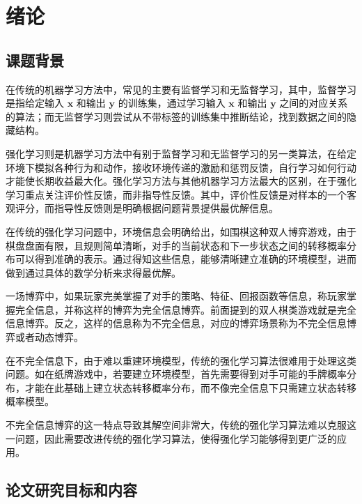 
\chapter{绪论}
\label{chpt:introduction}

\section{课题背景}

在传统的机器学习方法中，常见的主要有监督学习和无监督学习\cite{goodfellow2016deep}，其中，监督学习是指给定输入 $\boldsymbol{x}$ 和输出 $\boldsymbol{y}$ 的训练集，通过学习输入 $\boldsymbol{x}$ 和输出 $\boldsymbol{y}$ 之间的对应关系的算法；而无监督学习则尝试从不带标签的训练集中推断结论，找到数据之间的隐藏结构\cite{goodfellow2016deep}。

强化学习则是机器学习方法中有别于监督学习和无监督学习的另一类算法，在给定环境下模拟各种行为和动作，接收环境传递的激励和惩罚反馈，自行学习如何行动才能使长期收益最大化。强化学习方法与其他机器学习方法最大的区别，在于强化学习重点关注评价性反馈，而非指导性反馈。其中，评价性反馈是对样本的一个客观评分，而指导性反馈则是明确根据问题背景提供最优解信息\cite{sutton2018reinforcement}。

在传统的强化学习问题中，环境信息会明确给出，如围棋这种双人博弈游戏，由于棋盘盘面有限，且规则简单清晰，对手的当前状态和下一步状态之间的转移概率分布可以得到准确的表示\cite{silver2017mastering}。通过得知这些信息，能够清晰建立准确的环境模型，进而做到通过具体的数学分析来求得最优解。

一场博弈中，如果玩家完美掌握了对手的策略、特征、回报函数等信息，称玩家掌握{\jiacu 完全信息}，并称这样的博弈为{\jiacu 完全信息博弈}。前面提到的双人棋类游戏就是完全信息博弈。反之，这样的信息称为{\jiacu 不完全信息}，对应的博弈场景称为{\jiacu 不完全信息博弈}或者{\jiacu 动态博弈}\cite{marinatto2000quantum}。

在不完全信息下，由于难以重建环境模型，传统的强化学习算法很难用于处理这类问题\cite{macdermed2011markov}。如在纸牌游戏中，若要建立环境模型，首先需要得到对手可能的手牌概率分布，才能在此基础上建立状态转移概率分布，而不像完全信息下只需建立状态转移概率模型。

不完全信息博弈的这一特点导致其解空间非常大\cite{sandholm2010state}，传统的强化学习算法难以克服这一问题，因此需要改进传统的强化学习算法，使得强化学习能够得到更广泛的应用。

\section{论文研究目标和内容}

